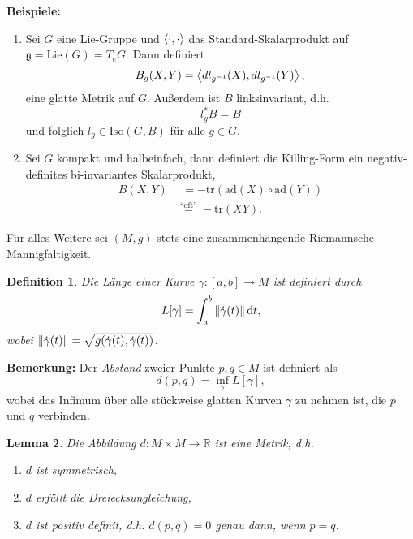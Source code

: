 \documentclass[12pt,a4paper]{article}
\def\R{\mathbb{R}}
\def\ad{\mathrm{ad}}
\def\Iso{\mathrm{Iso}}
\def\Lie{\mathrm{Lie}}
\def\g{\mathfrak{g}}
\def\tr{\mathrm{tr}}
\def\ad{\mathrm{ad}}
\newtheorem{Lemma}{Lemma}[section]
\newtheorem{Definition}[Lemma]{Definition}
\begin{document}
\bigskip



{\bf Beispiele:} 

\begin{enumerate}
  \item Sei $G$ eine Lie-Gruppe und $\left\langle\cdot,\cdot\right\rangle$ das
  Standard-Skalarprodukt auf $\g = \Lie(G) = T_eG$. Dann definiert
  $$
  B_g(X,Y) = \left\langle dl_{g^{-1}}(X),dl_{g^{-1}}(Y)\right\rangle,
  $$
  eine glatte Metrik auf $G$. Au\ss{}erdem ist $B$ linksinvariant, d.h.
  $$
  l_g^* B = B
  $$
  und folglich $l_g\in \Iso(G,B)$ f\"ur alle $g\in G$.
  \item Sei $G$ kompakt und halbeinfach, dann definiert die Killing-Form ein
  negativ-definites bi-invariantes Skalarprodukt,
  \begin{align*}
  B(X,Y) &\;\,= -\tr(\ad(X)\circ\ad(Y))\\
  &\overset{\text{``oft''}}{=} -\tr(XY).
  \end{align*}
\end{enumerate}

\bigskip

F\"ur alles Weitere sei $(M,g)$ stets eine zusammenh\"angende Riemannsche
Mannigfaltigkeit.

\begin{Definition}
Die \emph{L\"ange} einer Kurve $\gamma: [a,b]\to M$ ist definiert durch
$$
L[\gamma] = \int_a^b \left\|\dot{\gamma}(t)\right\|\mathrm{d}t,
$$
wobei $\left\|\dot{\gamma}(t)\right\| = \sqrt{g(\dot{\gamma}(t),\dot{\gamma}(t))}$.
\end{Definition}

\bigskip

{\bf Bemerkung:} Der \emph{Abstand} zweier Punkte $p,q\in M$ ist definiert als
$$
d(p,q) = \inf_{\gamma} L[\gamma],
$$
wobei das Infimum \"uber alle st\"uckweise glatten Kurven $\gamma$ zu nehmen ist,
die $p$ und $q$ verbinden.

\bigskip

\begin{Lemma}
Die Abbildung $d: M\times M\to \R$ ist eine Metrik, d.h.
\begin{enumerate}
  \item $d$ ist \emph{symmetrisch},
  \item $d$ erf\"ullt die \emph{Dreiecksungleichung},
  \item $d$ ist \emph{positiv definit}, d.h. $d(p,q) = 0$
  genau dann, wenn $p=q$.
\end{enumerate}
\end{Lemma}
\end{document}

